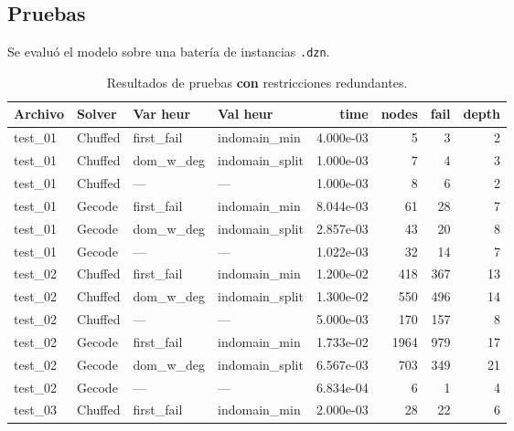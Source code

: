 
\subsection{Pruebas}\label{sec:01-sudoku-pruebas}
Se evaluó el modelo sobre una batería de instancias \texttt{.dzn}.

\begin{compactfloats}
\begin{table}[H]
  \centering
  \small
  \setlength{\tabcolsep}{2.8pt}
  \caption{Resultados de pruebas \textbf{con} restricciones redundantes.}
  \label{tab:pruebas-sudoku-on}
  \begin{tabular}{l l l l r r r r}
    \toprule
    \textbf{Archivo} & \textbf{Solver} & \textbf{Var heur} & \textbf{Val heur} & \textbf{time} & \textbf{nodes} & \textbf{fail} & \textbf{depth} \\
    \midrule
    test\_01 & Chuffed & first\_fail  & indomain\_min   & 4.000e-03 & 5   & 3   & 2 \\
    test\_01 & Chuffed & dom\_w\_deg  & indomain\_split & 1.000e-03 & 7   & 4   & 3 \\
    test\_01 & Chuffed & ---          & ---              & 1.000e-03 & 8   & 6   & 2 \\
    test\_01 & Gecode  & first\_fail  & indomain\_min   & 8.044e-03 & 61  & 28  & 7 \\
    test\_01 & Gecode  & dom\_w\_deg  & indomain\_split & 2.857e-03 & 43  & 20  & 8 \\
    test\_01 & Gecode  & ---          & ---              & 1.022e-03 & 32  & 14  & 7 \\
    \midrule
    test\_02 & Chuffed & first\_fail  & indomain\_min   & 1.200e-02 & 418 & 367 & 13 \\
    test\_02 & Chuffed & dom\_w\_deg  & indomain\_split & 1.300e-02 & 550 & 496 & 14 \\
    test\_02 & Chuffed & ---          & ---              & 5.000e-03 & 170 & 157 & 8 \\
    test\_02 & Gecode  & first\_fail  & indomain\_min   & 1.733e-02 & 1964 & 979 & 17 \\
    test\_02 & Gecode  & dom\_w\_deg  & indomain\_split & 6.567e-03 & 703  & 349 & 21 \\
    test\_02 & Gecode  & ---          & ---              & 6.834e-04 & 6    & 1   & 4 \\
    \midrule
    test\_03 & Chuffed & first\_fail  & indomain\_min   & 2.000e-03 & 28  & 22  & 6 \\

\end{tabular}
\end{table}
\end{compactfloats}
